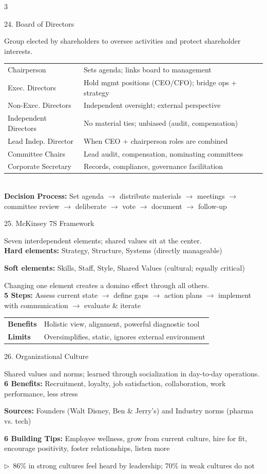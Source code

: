 \documentclass[7.5pt, letterpaper]{article}
\newcommand{\concept}[1]{%
  \vspace{2.5pt}%
  \noindent\colorbox{accent}{\parbox{\dimexpr\linewidth-2\fboxsep}{\fontsize{6.8pt}{7.5pt}\selectfont\bfseries\color{white}\strut #1\strut}}%
  \vspace{1pt}\par%
}
\newcommand{\kv}[2]{\noindent\textbf{#1:} #2\par}
\newcommand{\bul}[1]{\noindent$\triangleright$\ #1\par}
\newcommand{\minitab}[1]{%
  \begingroup
  \fontsize{6.2pt}{7pt}\selectfont
  \setlength{\tabcolsep}{2pt}
  #1
  \endgroup
}
\begin{document}
\begin{multicols}{3}
\concept{24. Board of Directors}
Group elected by shareholders to oversee activities and protect shareholder interests.\\
\minitab{\begin{tabular}{@{}ll@{}}
Chairperson & Sets agenda; links board to management\\
Exec. Directors & Hold mgmt positions (CEO/CFO); bridge ops + strategy\\
Non-Exec. Directors & Independent oversight; external perspective\\
Independent Directors & No material ties; unbiased (audit, compensation)\\
Lead Indep. Director & When CEO + chairperson roles are combined\\
Committee Chairs & Lead audit, compensation, nominating committees\\
Corporate Secretary & Records, compliance, governance facilitation\\
\end{tabular}}\\
\kv{Decision Process}{Set agenda $\to$ distribute materials $\to$ meetings $\to$ committee review $\to$ deliberate $\to$ vote $\to$ document $\to$ follow-up}

\concept{25. McKinsey 7S Framework}
Seven interdependent elements; shared values sit at the center.\\
\kv{Hard elements}{Strategy, Structure, Systems (directly manageable)}
\kv{Soft elements}{Skills, Staff, Style, Shared Values (cultural; equally critical)}
Changing one element creates a domino effect through all others.\\
\kv{5 Steps}{Assess current state $\to$ define gaps $\to$ action plans $\to$ implement with communication $\to$ evaluate \& iterate}
\minitab{\begin{tabular}{@{}ll@{}}
\textbf{Benefits} & Holistic view, alignment, powerful diagnostic tool\\
\textbf{Limits} & Oversimplifies, static, ignores external environment\\
\end{tabular}}

\concept{26. Organizational Culture}
Shared values and norms; learned through socialization in day-to-day operations.\\
\kv{6 Benefits}{Recruitment, loyalty, job satisfaction, collaboration, work performance, less stress}
\kv{Sources}{Founders (Walt Disney, Ben \& Jerry's) and Industry norms (pharma vs. tech)}
\kv{6 Building Tips}{Employee wellness, grow from current culture, hire for fit, encourage positivity, foster relationships, listen more}
\bul{86\% in strong cultures feel heard by leadership; 70\% in weak cultures do not}


\end{multicols}
\end{document}
